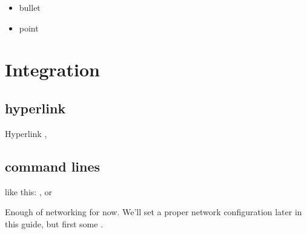 \documentclass[letterpaper,10pt,openany,oneside,english]{sphinxmanual}
\begin{document}
\sphinxAtStartPar
{}
\begin{itemize}
\item {} 
\sphinxAtStartPar
bullet

\item {} 
\sphinxAtStartPar
point

\end{itemize}


\chapter{Integration}
\label{\detokenize{integration:integration}}\label{\detokenize{integration::doc}}

\section{hyperlink}
\label{\detokenize{integration:hyperlink}}
\sphinxAtStartPar
Hyperlink ,


\section{command lines}
\label{\detokenize{integration:command-lines}}
\sphinxAtStartPar
like this: ,  or

\sphinxAtStartPar
Enough of networking for now. We’ll set a proper network configuration later in this guide, but first some .
\end{document}

